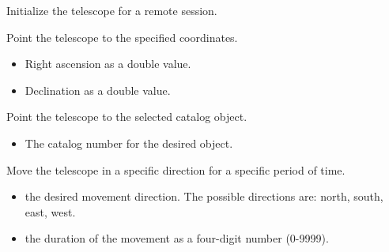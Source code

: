 \documentclass[a4paper,english]{article}
\begin{document}
\begin{Description}\setlength{\itemsep}{0cm}
\item[\Arg{init}] Initialize the telescope for a remote session.

	   

\item[\Arg{goto}] Point the telescope to the specified coordinates.

	     
	
	\begin{itemize}
		\item {} Right ascension as a double value.
		\item {} Declination as a double value.
	\end{itemize}
	
\item[\Arg{messier}] Point the telescope to the selected catalog object.

\item[\Arg{star}]	    
	
\item[\Arg{deepsky}]	    
	
	    
	
	\begin{itemize}
		\item {} The catalog number for the desired object.
	\end{itemize}

\item[\Arg{move}] Move the telescope in a specific direction for a specific period of time.

	     

	\begin{itemize}
		\item {} the desired movement direction. The possible directions are: north, south, east, west.
		\item {} the duration of the movement as a four-digit number (0-9999).
	\end{itemize}


\end{Description}
\end{document}
